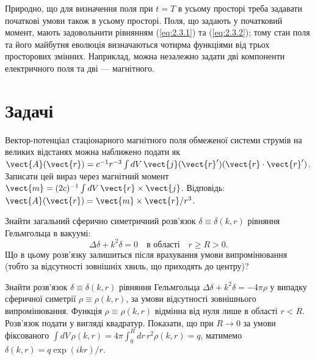 Природно, що для визначення поля при \( t = T \) в усьому просторі треба задавати початкові умови також в усьому просторі. Поля, що задають у початковий
момент, мають задовольнити рівнянням (\ref{eq:2.3.1}) та (\ref{eq:2.3.2}); тому стан поля та його майбутня еволюція визначаються чотирма функціями від
трьох просторових змінних. Наприклад, можна незалежно задати дві компоненти електричного поля та дві --- магнітного.

\section*{Задачі}

\begin{problem}%
Вектор-потенціал стаціонарного магнітного поля обмеженої системи струмів на великих відстанях можна наближено подати як \( \vect{A}(\vect{r}) =
c^{-1} r^{-3} \int dV \, \vect{j}(\vect{r}')(\vect{r} \cdot \vect{r}') \). Записати цей вираз через магнітний момент \( \vect{m} = (2c)^{-1} \int dV \,
\vect{r} \times \vect{j} \). Відповідь: \( \vect{A}(\vect{r}) = \vect{m} \times \vect{r} / r^3 \).
\end{problem}


\begin{problem}%
Знайти загальний сферично симетричний розв’язок \( \delta \equiv \delta(k, r) \) рівняння Гельмгольца в вакуумі:
\[
\Delta \delta + k^2 \delta = 0 \quad \text{в області} \quad r \geq R > 0.
\]
Що в цьому розв’язку залишиться після врахування умови випромінювання (тобто за відсутності зовнішніх хвиль, що приходять до центру)?
\end{problem}

\begin{problem}%
Знайти розв’язок \( \delta \equiv \delta(k, r) \) рівняння Гельмгольца \( \Delta \delta + k^2 \delta = -4\pi\rho \) у випадку сферичної симетрії \(
\rho \equiv \rho(k, r) \), за умови відсутності зовнішнього випромінювання. Функція \( \rho \equiv \rho(k, r) \) відмінна від нуля лише в області \( r <
R \). Розв’язок подати у вигляді квадратур. Показати, що при \( R \to 0 \) за умови фіксованого \( \int dV \, \rho(k, r) = 4\pi \int_0^R dr \, r^2
\rho(k, r) = q \), матимемо \( \delta(k, r) = q \exp(ikr) / r \).
\end{problem}

